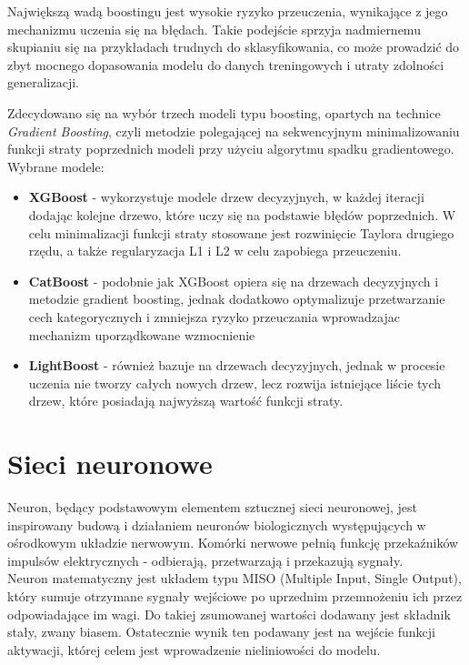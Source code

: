 \documentclass[a4paper,twoside,12pt]{book}
\begin{document}
Największą wadą boostingu jest wysokie ryzyko przeuczenia, wynikające z jego mechanizmu uczenia się na błędach. Takie podejście sprzyja nadmiernemu skupianiu się na przykładach trudnych do sklasyfikowania, co może prowadzić do zbyt mocnego dopasowania modelu do danych treningowych i utraty zdolności generalizacji.

Zdecydowano się na wybór trzech modeli typu boosting, opartych na technice \textit{Gradient Boosting}, czyli metodzie polegającej na sekwencyjnym minimalizowaniu funkcji straty poprzednich modeli przy użyciu algorytmu spadku gradientowego. Wybrane modele:
\begin{itemize}
	\item \textbf{XGBoost} - wykorzystuje modele drzew decyzyjnych, w każdej iteracji dodając kolejne drzewo, które uczy się na podstawie błędów poprzednich. W celu minimalizacji funkcji straty stosowane jest rozwinięcie Taylora drugiego rzędu, a także regularyzacja L1 i L2 w celu zapobiega przeuczeniu.

	\item \textbf{CatBoost} - podobnie jak XGBoost opiera się na drzewach decyzyjnych i metodzie gradient boosting, jednak dodatkowo optymalizuje przetwarzanie cech kategorycznych i zmniejsza ryzyko przeuczania wprowadzajac mechanizm uporządkowane wzmocnienie

	\item \textbf{LightBoost} - również bazuje na drzewach decyzyjnych, jednak w procesie uczenia nie tworzy całych nowych drzew, lecz rozwija istniejące liście tych drzew, które posiadają najwyższą wartość funkcji straty.

\end{itemize}

\section{Sieci neuronowe}
Neuron, będący podstawowym elementem sztucznej sieci neuronowej, jest inspirowany budową i działaniem neuronów biologicznych występujących w ośrodkowym układzie nerwowym. Komórki nerwowe pełnią funkcję przekaźników impulsów elektrycznych - odbierają, przetwarzają i przekazują sygnały.\\

Neuron matematyczny jest układem typu MISO (Multiple Input, Single Output), który sumuje otrzymane sygnały wejściowe po uprzednim przemnożeniu ich przez odpowiadające im wagi. Do takiej zsumowanej wartości dodawany jest składnik stały, zwany biasem. Ostatecznie wynik ten podawany jest na wejście funkcji aktywacji, której celem jest wprowadzenie nieliniowości do modelu\cite{hertz1993}.
\end{document}

